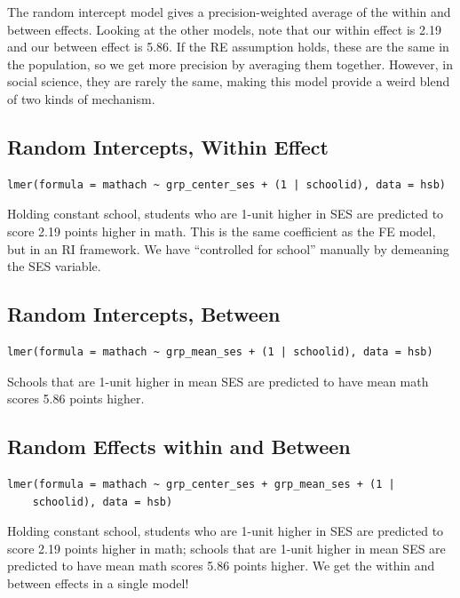 \documentclass[
  letterpaper,
  DIV=11,
  numbers=noendperiod]{scrreprt}
\begin{document}
The random intercept model gives a precision-weighted average of the
within and between effects. Looking at the other models, note that our
within effect is 2.19 and our between effect is 5.86. If the RE
assumption holds, these are the same in the population, so we get more
precision by averaging them together. However, in social science, they
are rarely the same, making this model provide a weird blend of two
kinds of mechanism.

\hypertarget{random-intercepts-within-effect}{%
\subsection{Random Intercepts, Within
Effect}\label{random-intercepts-within-effect}}

\begin{verbatim}
lmer(formula = mathach ~ grp_center_ses + (1 | schoolid), data = hsb)
\end{verbatim}

Holding constant school, students who are 1-unit higher in SES are
predicted to score 2.19 points higher in math. This is the same
coefficient as the FE model, but in an RI framework. We have
``controlled for school'' manually by demeaning the SES variable.

\hypertarget{random-intercepts-between}{%
\subsection{Random Intercepts,
Between}\label{random-intercepts-between}}

\begin{verbatim}
lmer(formula = mathach ~ grp_mean_ses + (1 | schoolid), data = hsb)
\end{verbatim}

Schools that are 1-unit higher in mean SES are predicted to have mean
math scores 5.86 points higher.

\hypertarget{random-effects-within-and-between}{%
\subsection{Random Effects within and
Between}\label{random-effects-within-and-between}}

\begin{verbatim}
lmer(formula = mathach ~ grp_center_ses + grp_mean_ses + (1 | 
    schoolid), data = hsb)
\end{verbatim}

Holding constant school, students who are 1-unit higher in SES are
predicted to score 2.19 points higher in math; schools that are 1-unit
higher in mean SES are predicted to have mean math scores 5.86 points
higher. We get the within and between effects in a single model!
\end{document}
